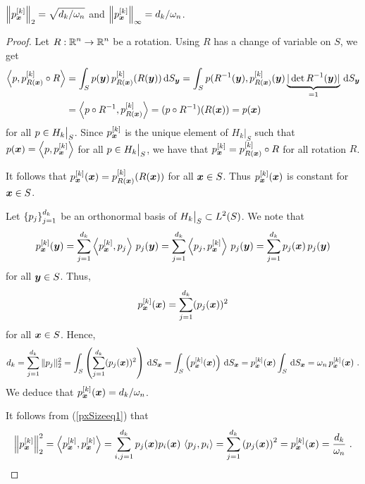 \begin{prop} \label{L2NormPx}
$\displaystyle \left\| p_{{\bm{x}}}^{[k]} \right\|_2 = \sqrt{d_k/\omega_n}$ and
$\displaystyle \left\| p_{{\bm{x}}}^{[k]} \right\|_\infty = d_k/\omega_n$.  
\end{prop}

\begin{proof}
 Let $\displaystyle R:\mathbb{R}^n \to \mathbb{R}^n$ be a rotation.  Using
$R$ has a change of variable on $S$, we get
\begin{align*}
\left\langle{p} , {p_{R({\bm{x}})}^{[k]}\circ R}\right\rangle
&= \int_S p({\bm{y}})\, p_{R({\bm{x}})}^{[k]}(R({\bm{y}})) \,\mathrm{d}{S}_{{\bm{y}}}  
= \int_S p(R^{-1}({\bm{y}}), p_{R({\bm{x}})}^{[k]}({\bm{y}})
\underbrace{|\det R^{-1}({\bm{y}})|}_{=1} \,\mathrm{d}{S}_{{\bm{y}}} \\
&= \left\langle{p\circ R^{-1}} , {p_{R({\bm{x}})}^{[k]}}\right\rangle
= (p\circ R^{-1})(R({\bm{x}})) = p({\bm{x}})
\end{align*}
for all $\displaystyle p \in H_k\big|_S$.  Since
$\displaystyle p_{{\bm{x}}}^{[k]}$ is the
unique element of $H_k\big|_S$ such that
$\displaystyle p({\bm{x}}) = \left\langle{p} , {p_{{\bm{x}}}^{[k]}}\right\rangle$ for all
$\displaystyle p \in H_k\big|_S$, we have that
$\displaystyle p_{{\bm{x}}}^{[k]} = p_{R({\bm{x}})}^{[k]}\circ R$ for
all rotation $R$.

It follows that
$\displaystyle p_{{\bm{x}}}^{[k]}({\bm{x}}) = p_{R({\bm{x}})}^{[k]}(R({\bm{x}}))$
for all ${\bm{x}} \in S$.  Thus
$\displaystyle p_{{\bm{x}}}^{[k]}({\bm{x}})$ is constant for
${\bm{x}} \in S$.

Let $\displaystyle \left\{ p_j\right\}_{j=1}^{d_k}$ be an orthonormal basis of
$\displaystyle H_k\big|_S \subset L^2(S)$.  We note that
\begin{equation} \label{pxSizeeq1}
p_{{\bm{x}}}^{[k]}({\bm{y}})
= \sum_{j=1}^{d_k} \left\langle{p_{{\bm{x}}}^{[k]}} , {p_j}\right\rangle\, p_j({\bm{y}})
= \sum_{j=1}^{d_k} \left\langle{p_j} , {p_{{\bm{x}}}^{[k]}}\right\rangle\, p_j({\bm{y}})
= \sum_{j=1}^{d_k} p_j({\bm{x}}) \, p_j({\bm{y}})
\end{equation}
for all ${\bm{y}} \in S$.  Thus,
\[
p_{{\bm{x}}}^{[k]}({\bm{x}}) = \sum_{j=1}^{d_k} (p_j({\bm{x}}))^2
\]
for all ${\bm{x}} \in S$.  Hence,
\[
d_k = \sum_{j=1}^{d_k} \|p_j\|_2^2
= \int_S \left( \sum_{j=1}^{d_k} (p_j({\bm{x}}))^2 \right) \,\mathrm{d}{S}_{{\bm{x}}} 
= \int_S \left( p_{{\bm{x}}}^{[k]}({\bm{x}}) \right) \,\mathrm{d}{S}_{{\bm{x}}}
= p_{{\bm{x}}}^{[k]}({\bm{x}}) \int_S \,\mathrm{d}{S}_{{\bm{x}}} 
= \omega_n\, p_{{\bm{x}}}^{[k]}({\bm{x}}) \ .
\]
We deduce that
$\displaystyle p_{{\bm{x}}}^{[k]}({\bm{x}}) = d_k/\omega_n$.

 It follows from (\ref{pxSizeeq1}) that
\[
\left\|p_{{\bm{x}}}^{[k]}\right\|_2^2 = \left\langle{p_{{\bm{x}}}^{[k]}} , {p_{{\bm{x}}}^{[k]}}\right\rangle
= \sum_{i,j=1}^{d_k} p_j({\bm{x}}) p_i({\bm{x}}) \, \left\langle{p_j} , {p_i}\right\rangle
= \sum_{j=1}^{d_k} \left(p_j({\bm{x}})\right)^2 = p_{{\bm{x}}}^{[k]}({\bm{x}})
= \frac{d_k}{\omega_n} \ .
\]


\end{proof}
